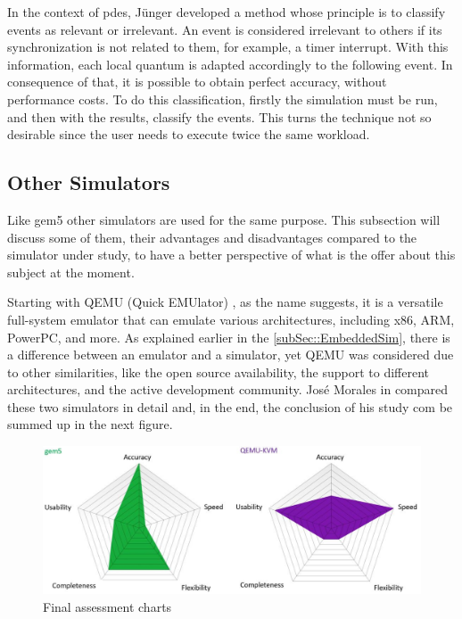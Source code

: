 In the context of \gls{pdes}, Jünger developed a method whose principle is to classify events as relevant or irrelevant. An event is considered irrelevant to others if its synchronization is not related to them, for example, a timer interrupt. With this information, each local quantum is adapted accordingly to the following event. In consequence of that, it is possible to obtain perfect accuracy, without performance costs. To do this classification, firstly the simulation must be run, and then with the results, classify the events. This turns the technique not so desirable since the user needs to execute twice the same workload. 


\subsection{Other Simulators}


Like gem5 other simulators are used for the same purpose. This subsection will discuss some of them, their advantages and disadvantages compared to the simulator under study, to have a better perspective of what is the offer about this subject at the moment. 

Starting with QEMU (Quick EMUlator) \cite{theQEMUsimulator}, as the name suggests, it is a versatile full-system emulator that can emulate various architectures, including x86, ARM, PowerPC, and more. As explained earlier in the \autoref{subSec::EmbeddedSim}, there is a difference between an emulator and a simulator, yet QEMU was considered due to other similarities, like the open source availability, the support to different architectures, and the active development community. José Morales in \cite{morales2016evaluating} compared these two simulators in detail and, in the end, the conclusion of his study com be summed up in the next figure.

\begin{figure}[H]
	\centering
 	\includegraphics[width=0.8\linewidth]{Images/gem5VSQEMU.png}
 	\caption{Final assessment charts \cite{morales2016evaluating}}
	 \label{fig_gem5VSQEMU}
\end{figure}

